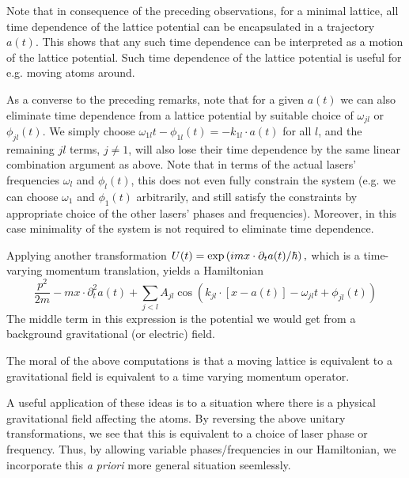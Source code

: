 \documentclass[aps,prb,floatfix,amsmath,amssymb,groupedaddress]{revtex4}
\begin{document}
Note that in consequence of the preceding observations, for a minimal lattice, all time dependence of the lattice potential can be encapsulated in a trajectory $a(t)$.  This shows that any such time dependence can be interpreted as a motion of the lattice potential.  Such time dependence of the lattice potential is useful for e.g. moving atoms around.  

As a converse to the preceding remarks, note that for a given $a(t)$ we can also eliminate time dependence from a lattice potential by suitable choice of $\omega_{jl}$ or $\phi_{jl}(t)$.  We simply choose $\omega_{1l} t -\phi_{1l}(t) = -k_{1l}\cdot a(t)$ for all $l$, and the remaining $jl$ terms, $j\neq 1$, will also lose their time dependence by the same linear combination argument as above.  Note that in terms of the actual lasers' frequencies $\omega_l$ and $\phi_l(t)$, this does not even fully constrain the system (e.g. we can choose $\omega_1$ and $\phi_1(t)$ arbitrarily, and still satisfy the constraints by appropriate choice of the other lasers' phases and frequencies).  Moreover, in this case minimality of the system is not required to eliminate time dependence. 

Applying another transformation $U(t) = \exp\left( i m x \cdot {\partial_t} a(t)/\hbar\right),$ which is a time-varying momentum translation, yields a Hamiltonian 
\begin{equation}
\frac{p^2}{2m} - m x\cdot \partial_t^2 a(t) + \sum_{j<l} A_{jl} \cos\left(k_{jl} \cdot \left[x-a(t)\right] - \omega_{jl} t + \phi_{jl}(t)\right)
\label{gravH}
\end{equation}
The middle term in this expression is the potential we would get from a background gravitational (or electric) field. 

The moral of the above computations is that a moving lattice is equivalent to a gravitational field is equivalent to a time varying momentum operator.

A useful application of these ideas is to a situation where there is a physical gravitational field affecting the atoms.  By reversing the above unitary transformations, we see that this is equivalent to a choice of laser phase or frequency.  Thus, by allowing variable phases/frequencies in our Hamiltonian, we incorporate this \textit{a priori} more general situation seemlessly. 
\end{document}
